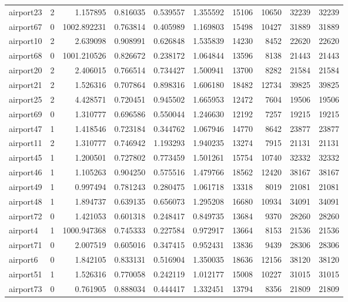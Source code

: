 \begin{longtable}{|l|r|r|r|r|r|r|r|r|r|}
airport23 & 2 & 1.157895 & 0.816035 & 0.539557 & 1.355592 & 15106 & 10650 & 32239 & 32239 \\
airport67 & 0 & 1002.892231 & 0.763814 & 0.405989 & 1.169803 & 15498 & 10427 & 31889 & 31889 \\
airport10 & 2 & 2.639098 & 0.908991 & 0.626848 & 1.535839 & 14230 & 8452 & 22620 & 22620 \\
airport68 & 0 & 1001.210526 & 0.826672 & 0.238172 & 1.064844 & 13596 & 8138 & 21443 & 21443 \\
airport20 & 2 & 2.406015 & 0.766514 & 0.734427 & 1.500941 & 13700 & 8282 & 21584 & 21584 \\
airport21 & 2 & 1.526316 & 0.707864 & 0.898316 & 1.606180 & 18482 & 12734 & 39825 & 39825 \\
airport25 & 2 & 4.428571 & 0.720451 & 0.945502 & 1.665953 & 12472 & 7604 & 19506 & 19506 \\
airport69 & 0 & 1.310777 & 0.696586 & 0.550044 & 1.246630 & 12192 & 7257 & 19215 & 19215 \\
airport47 & 1 & 1.418546 & 0.723184 & 0.344762 & 1.067946 & 14770 & 8642 & 23877 & 23877 \\
airport11 & 2 & 1.310777 & 0.746942 & 1.193293 & 1.940235 & 13274 & 7915 & 21131 & 21131 \\
airport45 & 1 & 1.200501 & 0.727802 & 0.773459 & 1.501261 & 15754 & 10740 & 32332 & 32332 \\
airport46 & 1 & 1.105263 & 0.904250 & 0.575516 & 1.479766 & 18562 & 12420 & 38167 & 38167 \\
airport49 & 1 & 0.997494 & 0.781243 & 0.280475 & 1.061718 & 13318 & 8019 & 21081 & 21081 \\
airport48 & 1 & 1.894737 & 0.639135 & 0.656073 & 1.295208 & 16680 & 10934 & 34091 & 34091 \\
airport72 & 0 & 1.421053 & 0.601318 & 0.248417 & 0.849735 & 13684 & 9370 & 28260 & 28260 \\
airport4 & 1 & 1000.947368 & 0.745333 & 0.227584 & 0.972917 & 13664 & 8153 & 21536 & 21536 \\
airport71 & 0 & 2.007519 & 0.605016 & 0.347415 & 0.952431 & 13836 & 9439 & 28306 & 28306 \\
airport6 & 0 & 1.842105 & 0.833131 & 0.516904 & 1.350035 & 18636 & 12156 & 38120 & 38120 \\
airport51 & 1 & 1.526316 & 0.770058 & 0.242119 & 1.012177 & 15008 & 10227 & 31015 & 31015 \\
airport73 & 0 & 0.761905 & 0.888034 & 0.444417 & 1.332451 & 13794 & 8356 & 21809 & 21809 \\

\end{longtable}
